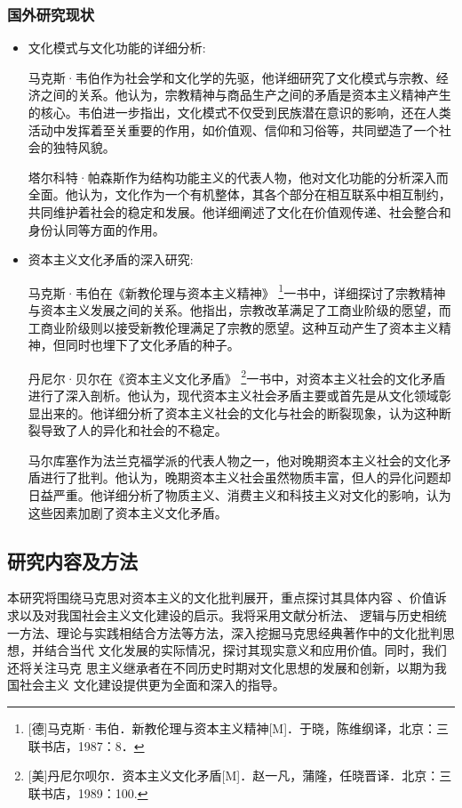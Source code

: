 \subsubsection{国外研究现状}

\begin{itemize}
    \item {\heiti 文化模式与文化功能的详细分析:}
    
    \qquad 马克斯·韦伯作为社会学和文化学的先驱，他详细研究了文化模式与宗教、经济之间的关系。他认为，宗教精神与商品生产之间的矛盾是资本主义精神产生的核心。韦伯进一步指出，文化模式不仅受到民族潜在意识的影响，还在人类活动中发挥着至关重要的作用，如价值观、信仰和习俗等，共同塑造了一个社会的独特风貌。
    
    \qquad 塔尔科特·帕森斯作为结构功能主义的代表人物，他对文化功能的分析深入而全面。他认为，文化作为一个有机整体，其各个部分在相互联系中相互制约，共同维护着社会的稳定和发展。他详细阐述了文化在价值观传递、社会整合和身份认同等方面的作用。
    \item {\heiti 资本主义文化矛盾的深入研究:}
    
    \qquad 马克斯·韦伯在《新教伦理与资本主义精神》
    \footnote{[德]马克斯·韦伯．新教伦理与资本主义精神[M]．于晓，陈维纲译，北京：三联书店，1987：8．
    }一书中，详细探讨了宗教精神与资本主义发展之间的关系。他指出，宗教改革满足了工商业阶级的愿望，而工商业阶级则以接受新教伦理满足了宗教的愿望。这种互动产生了资本主义精神，但同时也埋下了文化矛盾的种子。
    
    \qquad 丹尼尔·贝尔在《资本主义文化矛盾》
    \footnote{[美]丹尼尔呗尔．资本主义文化矛盾[M]．赵一凡，蒲隆，任晓晋译．北京：三联书店，1989：100.
    }一书中，对资本主义社会的文化矛盾进行了深入剖析。他认为，现代资本主义社会矛盾主要或首先是从文化领域彰显出来的。他详细分析了资本主义社会的文化与社会的断裂现象，认为这种断裂导致了人的异化和社会的不稳定。
    
    \qquad 马尔库塞作为法兰克福学派的代表人物之一，他对晚期资本主义社会的文化矛盾进行了批判。他认为，晚期资本主义社会虽然物质丰富，但人的异化问题却日益严重。他详细分析了物质主义、消费主义和科技主义对文化的影响，认为这些因素加剧了资本主义文化矛盾。
    
\end{itemize}

\subsection{研究内容及方法}
本研究将围绕马克思对资本主义的文化批判展开，重点探讨其具体内容
、价值诉求以及对我国社会主义文化建设的启示。我将采用文献分析法、
逻辑与历史相统一方法、理论与实践相结合方法等方法，深入挖掘马克思经典著作中的文化批判思想，并结合当代
文化发展的实际情况，探讨其现实意义和应用价值。同时，我们还将关注马克
思主义继承者在不同历史时期对文化思想的发展和创新，以期为我国社会主义
文化建设提供更为全面和深入的指导。

